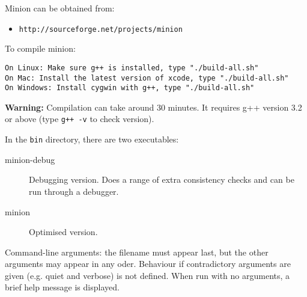\documentclass{article}
\begin{document}
{\sc Minion} can be obtained from:

\begin{small}
\begin{itemize}
\item \texttt{http://sourceforge.net/projects/minion}
\end{itemize}

To compile {\sc minion}:

\begin{verbatim}
On Linux: Make sure g++ is installed, type "./build-all.sh"
On Mac: Install the latest version of xcode, type "./build-all.sh"
On Windows: Install cygwin with g++, type "./build-all.sh"
\end{verbatim}
{\bf Warning:} Compilation can take around 30 minutes. It requires g++
version 3.2 or above (type \texttt{g++ -v} to
check version). 

In the {\tt bin} directory, there are two executables:

\begin{description}
\item[minion-debug] Debugging version. Does a range of extra consistency
checks and can be run through a debugger.
\item[minion] Optimised version.
\end{description}

Command-line arguments: the filename must appear last, but the other arguments may appear in any oder.   Behaviour if contradictory arguments are given (e.g. quiet and verbose) is not defined.
When run with no arguments, a brief help message is displayed.


\end{small}
\end{document}
